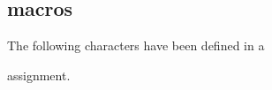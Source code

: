 \documentclass{book}
\begin{document}
\subsection{\protect{} macros}

The following characters have been defined
in a
\begin{disp}\lb{}\rb
\end{disp}
assignment.
\par\leavevmode\par
\end{document}
